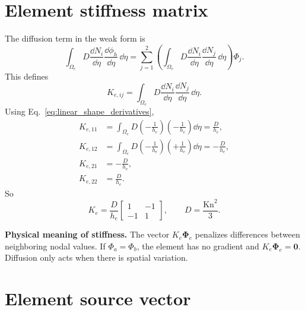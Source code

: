 \documentclass[11pt]{article}
\begin{document}
\section{Element stiffness matrix}
The diffusion term in the weak form is
\begin{equation}
    \int_{\Omega_e}D\frac{\dd N_i}{\dd\eta}\frac{\dd\phi_h}{\dd\eta}\,\dd\eta
    =\sum_{j=1}^{2}\left(\int_{\Omega_e}D\frac{\dd N_i}{\dd\eta}\frac{\dd N_j}{\dd\eta}\,\dd\eta\right)\Phi_j.
\end{equation}
This defines
\begin{equation}
    \boxed{K_{e,ij}=\int_{\Omega_e}D\frac{\dd N_i}{\dd\eta}\frac{\dd N_j}{\dd\eta}\,\dd\eta.}
    \label{eq:element_stiffness_def}
\end{equation}
Using Eq.~\eqref{eq:linear_shape_derivatives},
\begin{align}
    K_{e,11}&=\int_{\Omega_e}D\left(-\frac{1}{h_e}\right)\left(-\frac{1}{h_e}\right)\dd\eta=\frac{D}{h_e},\\
    K_{e,12}&=\int_{\Omega_e}D\left(-\frac{1}{h_e}\right)\left(+\frac{1}{h_e}\right)\dd\eta=-\frac{D}{h_e},\\
    K_{e,21}&=-\frac{D}{h_e},\\
    K_{e,22}&=\frac{D}{h_e}.
\end{align}
So
\begin{equation}
    \boxed{
    K_e=\frac{D}{h_e}
    \begin{bmatrix}
    1 & -1\\
    -1 & 1
    \end{bmatrix},
    \qquad
    D=\frac{\mathrm{Kn}^2}{3}.}
    \label{eq:linear_element_stiffness}
\end{equation}

\begin{physicsbox}
\textbf{Physical meaning of stiffness.} The vector \(K_e\bm{\Phi}_e\) penalizes differences between neighboring nodal values. If \(\Phi_a=\Phi_b\), the element has no gradient and \(K_e\bm{\Phi}_e=\bm{0}\). Diffusion only acts when there is spatial variation.
\end{physicsbox}

\section{Element source vector}
\end{document}

